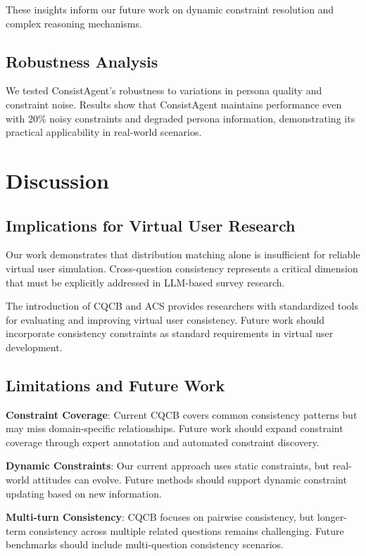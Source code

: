 \documentclass[sigconf, anonymous]{acmart}
\begin{document}
These insights inform our future work on dynamic constraint resolution and complex reasoning mechanisms.

\subsection{Robustness Analysis}

We tested ConsistAgent's robustness to variations in persona quality and constraint noise. Results show that ConsistAgent maintains performance even with 20\% noisy constraints and degraded persona information, demonstrating its practical applicability in real-world scenarios.

\section{Discussion}

\subsection{Implications for Virtual User Research}

Our work demonstrates that distribution matching alone is insufficient for reliable virtual user simulation. Cross-question consistency represents a critical dimension that must be explicitly addressed in LLM-based survey research.

The introduction of CQCB and ACS provides researchers with standardized tools for evaluating and improving virtual user consistency. Future work should incorporate consistency constraints as standard requirements in virtual user development.

\subsection{Limitations and Future Work}

\textbf{Constraint Coverage}: Current CQCB covers common consistency patterns but may miss domain-specific relationships. Future work should expand constraint coverage through expert annotation and automated constraint discovery.

\textbf{Dynamic Constraints}: Our current approach uses static constraints, but real-world attitudes can evolve. Future methods should support dynamic constraint updating based on new information.

\textbf{Multi-turn Consistency}: CQCB focuses on pairwise consistency, but longer-term consistency across multiple related questions remains challenging. Future benchmarks should include multi-question consistency scenarios.
\end{document}
